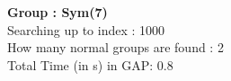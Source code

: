 \textbf{Group : Sym(7)}\\
Searching up to index : 1000\\
How many normal groups are found : 2\\
Total Time (in s) in GAP: 0.8\\
